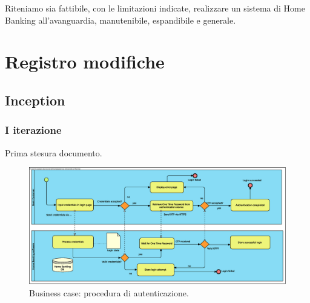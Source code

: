 \documentclass[10pt]{softeng} %
\begin{document}
Riteniamo sia fattibile, con le limitazioni indicate, realizzare un sistema di Home Banking all'avanguardia, manutenibile, espandibile e generale.


\section{Registro modifiche}

\subsection{Inception}

\subsubsection{I iterazione}

Prima stesura documento.


\printcustombibsmall{}


\begin{figure}[hbt]
	\centering
	\includegraphics[width=\textheight, angle=90]{Images/Authentication.eps}
	\caption{Business case: procedura di autenticazione.}
	\label{fig:business_case_authentication}
\end{figure}
\end{document}
